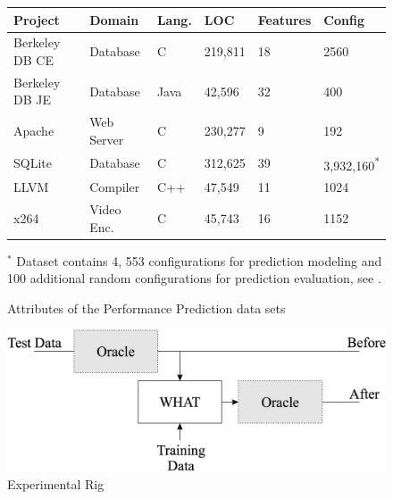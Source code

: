 \documentclass[conference]{IEEEtran}
\begin{document}
\begin{figure}[!hbp]
  \renewcommand{\baselinestretch}{1}\begin{center}
{\scriptsize
\begin{tabular}{llllll}
  \hline
  \rowcolor{lightgray}
Project & Domain & Lang. & LOC & Features & Config\\\hline

Berkeley DB CE & Database & C & 219,811 & 18 & 2560\\

Berkeley DB JE & Database & Java & 42,596 & 32  & 400\\

Apache & Web Server & C & 230,277 & 9 & 192\\

SQLite & Database & C & 312,625 & 39 & 3,932,160\textsuperscript{*}\\

LLVM & Compiler & C++ & 47,549 & 11 & 1024\\

x264 & Video Enc. & C& 45,743 & 16 & 1152\\\hline
\end{tabular}}\par\medskip

{ \footnotesize $^*$ Dataset contains 4, 553 configurations for prediction modeling and 100 additional random configurations for prediction evaluation, see \cite{vapp}.}
\end{center}

\caption{Attributes of the Performance Prediction data sets}\label{fig:cpm}
\end{figure}



\begin{figure}[tbp!]
\includegraphics[width=\linewidth]{_figs/WHAT}
\caption{Experimental Rig}
\label{fig:rig}
  
  

\end{figure}
\end{document}
